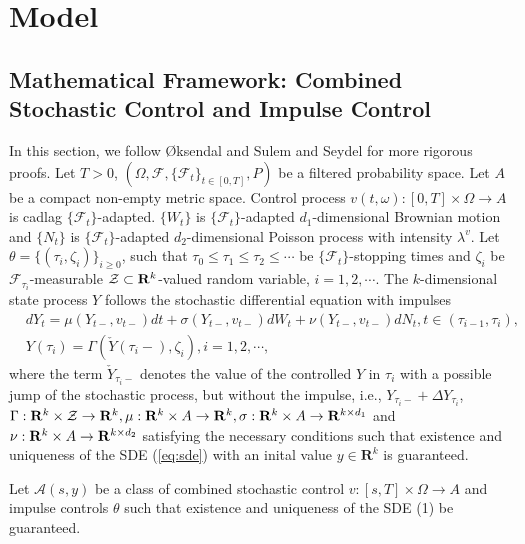 \documentclass[12pt]{article}
\begin{document}
\section{Model}\label{sec:model}
\subsection{Mathematical Framework: Combined Stochastic Control and Impulse Control}\label{sec:math}
In this section, we follow \O{}ksendal and Sulem\cite{oksendal2019stochastic} and Seydel\cite{seydel2009existence} for more rigorous proofs.
Let $T>0$, $(\Omega, \mathcal{F},\{\mathcal{F}_t\}_{t\in [0, T]}, P)$ be a filtered probability space.
Let $A$ be a compact non-empty metric space.  Control process $v(t, \omega): [0, T] \times \Omega \rightarrow A$ is cadlag $\{\mathcal{F}_{t}\}$-adapted.
$\{W_t\}$ is $\{\mathcal{F}_{t}\}$-adapted $d_1$-dimensional Brownian motion and $\{N_t\}$ is $\{\mathcal{F}_{t}\}$-adapted $d_2$-dimensional Poisson process with intensity $\lambda^v$.
Let $\theta = \{(\tau_i, \zeta_i)\}_{i\ge0}$, such that $\tau_0 \le \tau_1 \le \tau_2 \le \cdots$ be $\{\mathcal{F}_t\}$-stopping times and $\zeta_i$ be $\mathcal{F}_{\tau_i}$-measurable $\mathcal{Z}\subset {\bf R}^k$-valued random variable, $i=1, 2,\cdots.$ 
The $k$-dimensional state process $Y$  follows the stochastic differential equation with impulses
\begin{align}\label{eq:sde}
  &dY_t = \mu(Y_{t-}, v_{t-})dt + \sigma(Y_{t-}, v_{t-}) dW_t + \nu(Y_{t-}, v_{t-})dN_t, t \in (\tau_{i-1}, \tau_{i}), \\
  &Y(\tau_i) = \Gamma(\check{Y}(\tau_i-), \zeta_i), i = 1, 2, \cdots, 
\end{align}
where the term $\check{Y}_{\tau_i-}$ denotes the value of the controlled $Y$ in ${\tau_i}$ with a possible jump of the
stochastic process, but without the impulse, i.e., $Y_{\tau_i-} + \Delta Y_{\tau_i}$, \ $\Gamma: {\bf R}^k \times \mathcal{Z} \rightarrow {\bf R}^k, \mu: {\bf R}^k \times A \rightarrow {\bf R}^k, \sigma: {\bf R}^k \times A \rightarrow {\bf R}^{k\times d_1}$ and $\nu: {\bf R}^k \times A \rightarrow {\bf R}^{k\times d_2}$
satisfying the necessary conditions such that existence and uniqueness of the SDE (\ref{eq:sde}) with an inital value $y \in \textbf{R}^k$ is guaranteed.

Let $\mathcal{A}(s, y)$ be a class of combined stochastic control $v: [s, T]\times \Omega \rightarrow A$ and impulse controls $\theta$ such that 
existence and uniqueness of the SDE (1) be guaranteed. 
\end{document}
